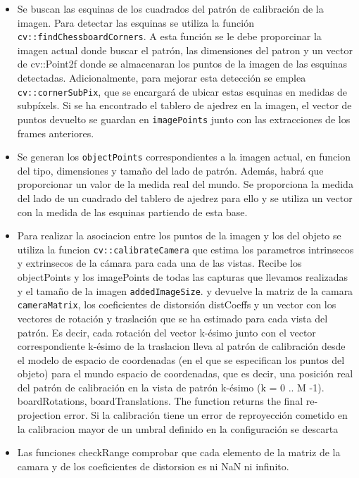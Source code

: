 \begin{itemize}

\item Se buscan las esquinas de los cuadrados del patrón de calibración de la imagen. Para detectar las esquinas se utiliza la función \texttt{cv::findChessboardCorners}. A esta función se le debe proporcinar la imagen actual donde buscar el patrón, las dimensiones del patron y un vector de cv::Point2f donde se almacenaran los puntos de la imagen de las esquinas detectadas. Adicionalmente, para mejorar esta detección se emplea \texttt{cv::cornerSubPix}, que se encargará de ubicar estas esquinas en medidas de subpíxels. Si se ha encontrado el tablero de ajedrez en la imagen, el vector de puntos devuelto se guardan en \texttt{imagePoints} junto con las extracciones de los frames anteriores.  

\item Se generan los \texttt{objectPoints} correspondientes a la imagen actual, en funcion del tipo, dimensiones y tamaño del lado de patrón. Además, habrá que proporcionar un valor de la medida real del mundo. Se proporciona la medida del lado de un cuadrado del tablero de ajedrez para ello y se utiliza un vector con la medida de las esquinas partiendo de esta base.

\item Para realizar la asociacion entre los puntos de la imagen y los del objeto se utiliza la funcion \texttt{cv::calibrateCamera} que estima los parametros intrinsecos y extrinsecos de la cámara para cada una de las vistas. Recibe los objectPoints y los imagePoints de todas las capturas que llevamos realizadas y el tamaño de la imagen \texttt{addedImageSize}. y devuelve la matriz de la camara \texttt{cameraMatrix}, los coeficientes de distorsión {distCoeffs} y un vector con los vectores de rotación y traslación que se ha estimado para cada vista del patrón. Es decir, cada rotación del vector k-ésimo junto con el vector correspondiente k-ésimo de la traslacion lleva al patrón de calibración desde el modelo de espacio de coordenadas (en el que se especifican los puntos del objeto) para el mundo espacio de coordenadas, que es decir, una posición real del patrón de calibración en la vista de patrón k-ésimo (k = 0 .. M -1). boardRotations, boardTranslations. The function returns the final re-projection error.
Si la calibración tiene un error de reproyección cometido en la calibracion mayor de un umbral definido en la configuración se descarta

\item Las funciones checkRange comprobar que cada elemento de la matriz de la camara y de los coeficientes de distorsion es ni NaN ni infinito. 


\end{itemize}

